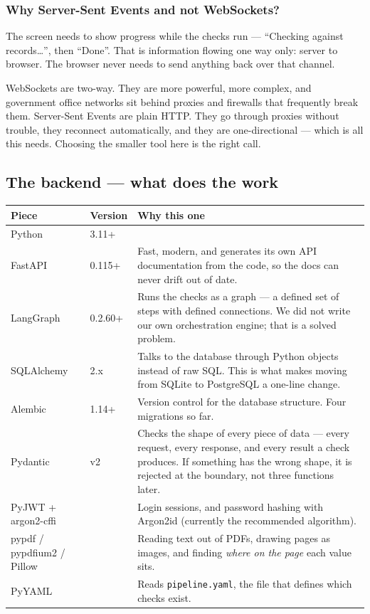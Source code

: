 \documentclass[11pt,a4paper]{article}
\begin{document}
\subsubsection*{Why Server-Sent Events and not WebSockets?}

The screen needs to show progress while the checks run --- ``Checking against
records\ldots{}'', then ``Done''. That is information flowing one way only:
server to browser. The browser never needs to send anything back over that
channel.

WebSockets are two-way. They are more powerful, more complex, and government
office networks sit behind proxies and firewalls that frequently break them.
Server-Sent Events are plain HTTP. They go through proxies without trouble,
they reconnect automatically, and they are one-directional --- which is all this
needs. Choosing the smaller tool here is the right call.

\subsection{The backend --- what does the work}

\begin{longtable}{@{}p{3.4cm}p{4.0cm}p{7.6cm}@{}}
\toprule
\textbf{Piece} & \textbf{Version} & \textbf{Why this one} \\
\midrule
\endhead
Python & 3.11+ & \\

FastAPI & 0.115+ & Fast, modern, and generates its own API documentation from
the code, so the docs can never drift out of date. \\

LangGraph & 0.2.60+ & Runs the checks as a graph --- a defined set of steps with
defined connections. We did not write our own orchestration engine; that is a
solved problem. \\

SQLAlchemy & 2.x & Talks to the database through Python objects instead of raw
SQL. This is what makes moving from SQLite to PostgreSQL a one-line change. \\

Alembic & 1.14+ & Version control for the database structure. Four migrations
so far. \\

Pydantic & v2 & Checks the shape of every piece of data --- every request, every
response, and every result a check produces. If something has the wrong shape,
it is rejected at the boundary, not three functions later. \\

PyJWT + argon2-cffi & & Login sessions, and password hashing with Argon2id
(currently the recommended algorithm). \\

pypdf / pypdfium2 / Pillow & & Reading text out of PDFs, drawing pages as
images, and finding \emph{where on the page} each value sits. \\

PyYAML & & Reads \texttt{pipeline.yaml}, the file that defines which checks
exist. \\
\bottomrule
\end{longtable}
\end{document}
